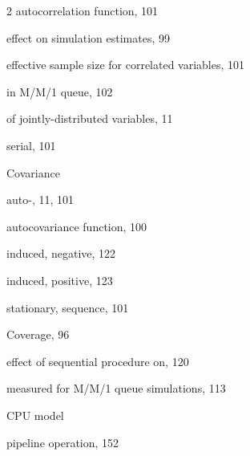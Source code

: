 \begin{multicols}{2}
\quad autocorrelation function, 101\par
\quad effect on simulation estimates, 99\par
\quad effective sample size for correlated variables, 101\par
\quad in M/M/1 queue, 102\par
\quad of jointly-distributed variables, 11\par
\quad serial, 101\par
\noindent Covariance\par
\quad auto-, 11, 101\par
\quad autocovariance function, 100\par
\quad induced, negative, 122\par
\quad induced, positive, 123\par
\quad stationary, sequence, 101\par
\noindent Coverage, 96\par
\quad effect of sequential procedure on, 120\par
\quad measured for M/M/1 queue simulations, 113\par
\noindent CPU model\par
\quad pipeline operation, 152\par
\end{multicols}
